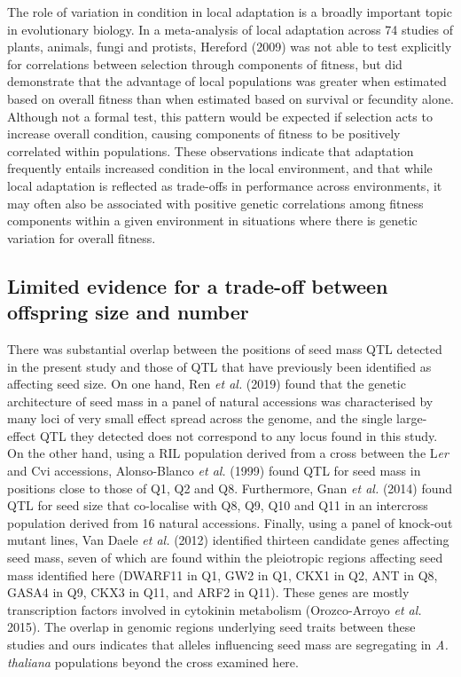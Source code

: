 \documentclass[
]{article}
\begin{document}
The role of variation in condition in local adaptation is a broadly important topic in evolutionary biology. In a meta-analysis of local adaptation across 74 studies of plants, animals, fungi and protists, Hereford (2009) was not able to test explicitly for correlations between selection through components of fitness, but did demonstrate that the advantage of local populations was greater when estimated based on overall fitness than when estimated based on survival or fecundity alone. Although not a formal test, this pattern would be expected if selection acts to increase overall condition, causing components of fitness to be positively correlated within populations. These observations indicate that adaptation frequently entails increased condition in the local environment, and that while local adaptation is reflected as trade-offs in performance across environments, it may often also be associated with positive genetic correlations among fitness components within a given environment in situations where there is genetic variation for overall fitness.

\hypertarget{limited-evidence-for-a-trade-off-between-offspring-size-and-number}{%
\subsection{Limited evidence for a trade-off between offspring size and number}\label{limited-evidence-for-a-trade-off-between-offspring-size-and-number}}

There was substantial overlap between the positions of seed mass QTL detected in the present study and those of QTL that have previously been identified as affecting seed size. On one hand, Ren \emph{et al.} (2019) found that the genetic architecture of seed mass in a panel of natural accessions was characterised by many loci of very small effect spread across the genome, and the single large-effect QTL they detected does not correspond to any locus found in this study. On the other hand, using a RIL population derived from a cross between the L\emph{er} and Cvi accessions, Alonso-Blanco \emph{et al.} (1999) found QTL for seed mass in positions close to those of Q1, Q2 and Q8. Furthermore, Gnan \emph{et al.} (2014) found QTL for seed size that co-localise with Q8, Q9, Q10 and Q11 in an intercross population derived from 16 natural accessions. Finally, using a panel of knock-out mutant lines, Van Daele \emph{et al.} (2012) identified thirteen candidate genes affecting seed mass, seven of which are found within the pleiotropic regions affecting seed mass identified here (DWARF11 in Q1, GW2 in Q1, CKX1 in Q2, ANT in Q8, GASA4 in Q9, CKX3 in Q11, and ARF2 in Q11). These genes are mostly transcription factors involved in cytokinin metabolism (Orozco-Arroyo \emph{et al.} 2015). The overlap in genomic regions underlying seed traits between these studies and ours indicates that alleles influencing seed mass are segregating in \emph{A. thaliana} populations beyond the cross examined here.
\end{document}
